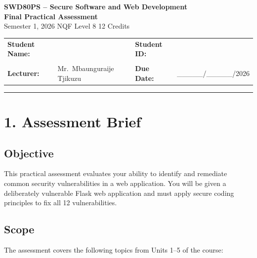 \documentclass[12pt,a4paper]{article}
\begin{document}
\vspace{2cm}

\begin{center}
{\large\textbf{SWD80PS -- Secure Software and Web Development}}\\[6pt]
{\Large\textcolor{iumred}{\textbf{Final Practical Assessment}}}\\[4pt]
{\small Semester 1, 2026 \hspace{1cm} NQF Level 8 \hspace{1cm} 12 Credits}
\end{center}

\vspace{1cm}

\noindent
\begin{tabularx}{\textwidth}{@{}lXlX@{}}
\textbf{Student Name:} & \hspace{3cm} & \textbf{Student ID:} & \\
& & & \\
\textbf{Lecturer:} & Mr.~Mbaunguraije Tjikuzu & \textbf{Due Date:} & \_\_\_\_\_/\_\_\_\_\_/2026 \\
\end{tabularx}

\vspace{1cm}

\hrule
\vspace{0.5cm}

\section*{1. Assessment Brief}

\subsection*{Objective}
This practical assessment evaluates your ability to identify and remediate common security vulnerabilities in a web application. You will be given a deliberately vulnerable Flask web application and must apply secure coding principles to fix all 12 vulnerabilities.

\subsection*{Scope}
The assessment covers the following topics from Units 1--5 of the course:
\end{document}
